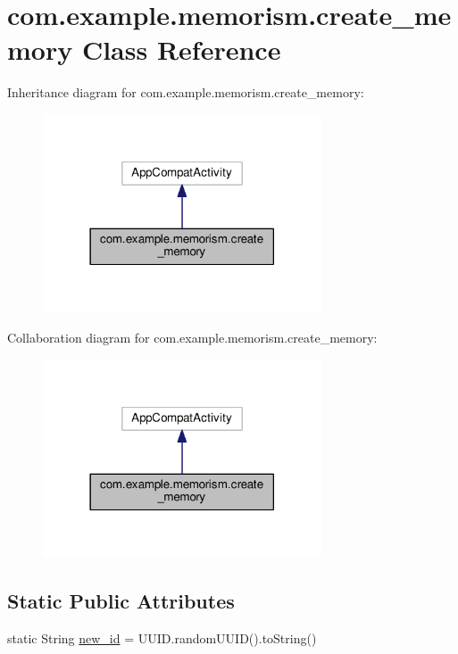\hypertarget{classcom_1_1example_1_1memorism_1_1create__memory}{}\section{com.\+example.\+memorism.\+create\+\_\+memory Class Reference}
\label{classcom_1_1example_1_1memorism_1_1create__memory}


Inheritance diagram for com.\+example.\+memorism.\+create\+\_\+memory\+:
\nopagebreak
\begin{figure}[H]
\begin{center}
\leavevmode
\includegraphics[width=234pt]{d0/dd9/classcom_1_1example_1_1memorism_1_1create__memory__inherit__graph}
\end{center}
\end{figure}


Collaboration diagram for com.\+example.\+memorism.\+create\+\_\+memory\+:
\nopagebreak
\begin{figure}[H]
\begin{center}
\leavevmode
\includegraphics[width=234pt]{d8/d29/classcom_1_1example_1_1memorism_1_1create__memory__coll__graph}
\end{center}
\end{figure}
\subsection*{Static Public Attributes}
\begin{DoxyCompactItemize}
\item 
static String \hyperlink{classcom_1_1example_1_1memorism_1_1create__memory_a6ca3be37a6f7c9d83536809cfbd99dc1}{new\+\_\+id} = U\+U\+I\+D.\+random\+U\+U\+ID().to\+String()
\end{DoxyCompactItemize}
